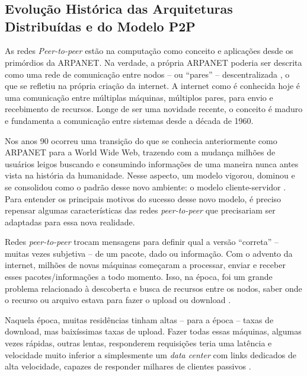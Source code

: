 \chapter{}

\section{Evolução Histórica das Arquiteturas Distribuídas e do Modelo P2P}

As redes \textit{Peer-to-peer} estão na computação como conceito e aplicações desde os
primórdios da ARPANET. Na verdade, a própria ARPANET poderia ser descrita
como uma rede de comunicação entre nodos -- ou ``pares'' -- descentralizada
\cite{crocker1969}, o que se refletiu na própria criação da internet. A
internet como é conhecida hoje é uma comunicação entre múltiplas máquinas,
múltiplos pares, para envio e recebimento de recursos. Longe de ser uma
novidade recente, o conceito é maduro e fundamenta a comunicação entre
sistemas desde a década de 1960.

Nos anos 90 ocorreu uma transição do que se conhecia anteriormente como
ARPANET para a World Wide Web, trazendo com a mudança milhões de usuários
leigos buscando e consumindo informações de uma maneira nunca antes vista na
história da humanidade. Nesse aspecto, um modelo vigorou, dominou e se
consolidou como o padrão desse novo ambiente: o modelo cliente-servidor
\cite{fieldingtaylor2000,tanenbaumvansteen2007}. Para entender os
principais motivos do sucesso desse novo modelo, é preciso repensar algumas
características das redes \textit{peer-to-peer} que precisariam ser adaptadas para
essa nova realidade.

Redes \textit{peer-to-peer} trocam mensagens para definir qual a versão ``correta''
-- muitas vezes subjetiva -- de um pacote, dado ou informação. Com o advento
da internet, milhões de novas máquinas começaram a processar, enviar e
receber esses pacotes/informações a todo momento. Isso, na época, foi um
grande problema relacionado à descoberta e busca de recursos entre os
nodos, saber onde o recurso ou arquivo estava para fazer o upload ou
download \cite{ripeanu2001}.

Naquela época, muitas residências tinham altas -- para a época -- taxas de
download, mas baixíssimas taxas de upload. Fazer todas essas máquinas,
algumas vezes rápidas, outras lentas, responderem requisições teria uma
latência e velocidade muito inferior a simplesmente um \textit{data center} com
links dedicados de alta velocidade, capazes de responder milhares de
clientes passivos \cite{saroiu2002}.

